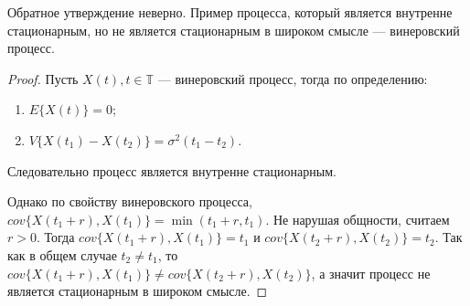 \begin{Remark}
	Обратное утверждение неверно. Пример процесса, который является внутренне стационарным, но не является стационарным в широком смысле --- винеровский процесс.
\end{Remark}
\begin{proof}
	Пусть $ X(t), t \in \mathbb{T} $ --- винеровский процесс, тогда по определению:
	\begin{enumerate}
		\item $ E \{ X(t) \} = 0 $;
		\item $ V \{ X(t_1) - X(t_2)\} = \sigma^{2}(t_1 - t_2) $.
	\end{enumerate}
	Следовательно процесс является внутренне стационарным.

  Однако по свойству винеровского процесса, $ cov \{ X(t_1 + r), X(t_1)\} = \min(t_1 + r, t_1) $. Не нарушая общности, считаем $ r > 0 $. Тогда $ cov \{ X(t_1 + r), X(t_1)\} = t_1 $ и $ cov \{ X(t_2 + r), X(t_2)\} = t_2 $. Так как в общем случае $ t_2 \ne t_1 $, то $ cov \{ X(t_1 + r), X(t_1)\} \ne cov \{ X(t_2 + r), X(t_2)\} $, а значит процесс не является стационарным в широком смысле.
\end{proof}

